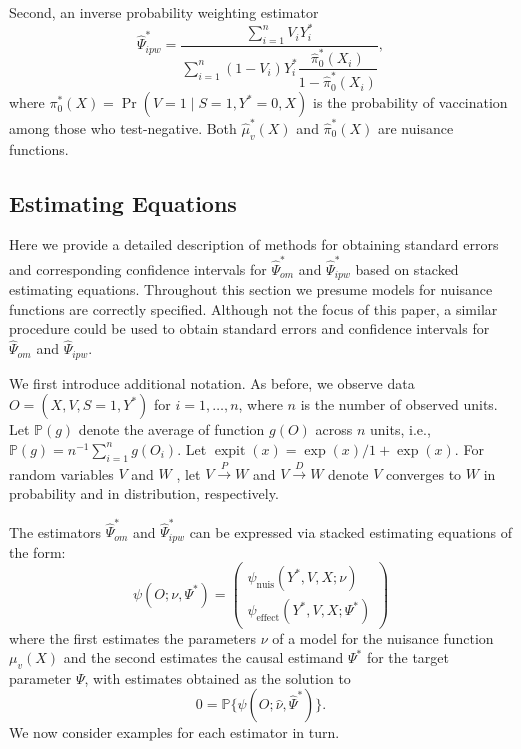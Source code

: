\begin{appendix}
\begin{refsection}
    Second, an inverse probability weighting estimator
    \begin{equation}\label{eqn:ipw_estimator_tnd}
        \widehat{\Psi}_{ipw}^* = \dfrac{\sum_{i=1}^n V_i Y^*_i}{\sum_{i=1}^n (1 - V_i) Y^*_i \dfrac{\widehat{\pi}_0^*(X_i)}{1 - \widehat{\pi}_0^*(X_i)}},
    \end{equation}
    where $\pi^*_0(X) = \Pr(V=1\mid S=1, Y^*=0, X)$ is the  probability of vaccination among those who test-negative. Both $\widehat{\mu}^*_v(X)$ and $\widehat{\pi}^*_0(X)$ are nuisance functions. 
    \newpage

    \subsection{Estimating Equations}
    Here we provide a detailed description of methods for obtaining standard errors and corresponding confidence intervals for $\widehat{\Psi}_{om}^*$ and $\widehat{\Psi}_{ipw}^*$ based on stacked estimating equations. Throughout this section we presume models for nuisance functions are correctly specified. Although not the focus of this paper, a similar procedure could be used to obtain standard errors and confidence intervals for $\widehat{\Psi}_{om}$ and $\widehat{\Psi}_{ipw}$.

    We first introduce additional notation. As before, we observe data $O = (X, V, S=1, Y^*)$ for $i = 1, \ldots, n$, where $n$ is the number of observed units. Let $\mathbb{P}(g)$ denote the average of function $g(O)$  across $n$ units, i.e., $\mathbb{P}(g) = n^{-1}\sum_{i=1}^n g(O_{i})$. Let $\operatorname{expit}(x) = \exp(x)/{1 + \exp(x)}$. For  random variables $V$ and $W$ , let $V \overset{P}{\rightarrow} W$ and $V \overset{D}{\rightarrow} W$ denote $V$ converges to $W$ in probability and in distribution, respectively.

    The estimators $\widehat{\Psi}^*_{om}$ and $\widehat{\Psi}^*_{ipw}$ can be expressed via stacked estimating equations of the form:
    \begin{equation*}
        \psi(O; \nu, \Psi^*) = \begin{pmatrix}
            \psi_{\text{nuis}}(Y^*, V, X; \nu) \\
            \psi_{\text{effect}}(Y^*, V, X; \Psi^*)
        \end{pmatrix}
    \end{equation*}
    where the first estimates the parameters $\nu$ of a model for the nuisance function $\mu_v(X)$ and the second estimates the causal estimand $\Psi^*$ for the target parameter $\Psi$, with estimates obtained as the solution to
    \begin{equation*}
        0 = \mathbb{P}\big\{\psi(O; \widehat{\nu}, \widehat{\Psi}^*)\big\}.
    \end{equation*}
    We now consider examples for each estimator in turn. 
    

\end{refsection}
\end{appendix}
